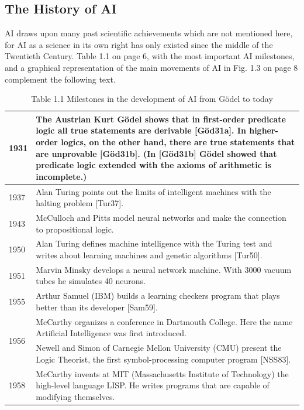 \documentclass[10pt]{article}
\begin{document}
\subsection*{The History of AI}
AI draws upon many past scientific achievements which are not mentioned here, for AI as a science in its own right has only existed since the middle of the Twentieth Century. Table 1.1 on page 6, with the most important AI milestones, and a graphical representation of the main movements of AI in Fig. 1.3 on page 8 complement the following text.

\begin{table}[h]
\begin{center}
\captionsetup{labelformat=empty}
\caption{Table 1.1 Milestones in the development of AI from Gödel to today}
\begin{tabular}{|l|l|}
\hline
1931 & The Austrian Kurt Gödel shows that in first-order predicate logic all true statements are derivable [Göd31a]. In higher-order logics, on the other hand, there are true statements that are unprovable [Göd31b]. (In [Göd31b] Gödel showed that predicate logic extended with the axioms of arithmetic is incomplete.) \\
\hline
1937 & Alan Turing points out the limits of intelligent machines with the halting problem [Tur37]. \\
\hline
1943 & McCulloch and Pitts model neural networks and make the connection to propositional logic. \\
\hline
1950 & Alan Turing defines machine intelligence with the Turing test and writes about learning machines and genetic algorithms [Tur50]. \\
\hline
1951 & Marvin Minsky develops a neural network machine. With 3000 vacuum tubes he simulates 40 neurons. \\
\hline
1955 & Arthur Samuel (IBM) builds a learning checkers program that plays better than its developer [Sam59]. \\
\hline
\multirow[t]{2}{*}{1956} & McCarthy organizes a conference in Dartmouth College. Here the name Artificial Intelligence was first introduced. \\
\hline
 & Newell and Simon of Carnegie Mellon University (CMU) present the Logic Theorist, the first symbol-processing computer program [NSS83]. \\
\hline
1958 & McCarthy invents at MIT (Massachusetts Institute of Technology) the high-level language LISP. He writes programs that are capable of modifying themselves. \\

\end{tabular}
\end{center}
\end{table}
\end{document}
